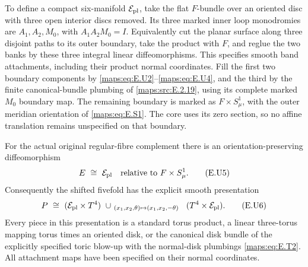 To define a compact six-manifold $\mathcal E_{\rm pl}$, take the
flat $F$-bundle over an oriented disc with three open interior
discs removed.  Its three marked inner loop monodromies are
$A_1,A_2,M_0$, with $A_1A_2M_0=I$.  Equivalently cut the planar
surface along three disjoint paths to its outer boundary, take
the product with $F$, and reglue the two banks by these three
integral linear diffeomorphisms.  This specifies smooth band
attachments, including their product normal coordinates.
Fill the first two boundary components by \eqref{maps:eq:E.U2}--\eqref{maps:eq:E.U4}, and
the third by the finite canonical-bundle plumbing of \ref{maps:src:E.2.19},
using its complete marked $M_0$ boundary map.  The remaining
boundary is marked as $F\times S^1_\mu$, with the outer meridian
orientation of \eqref{maps:eq:E.S1}.  The core uses its zero section, so no
affine translation remains unspecified on that boundary.

For the actual original regular-fibre complement there is an
orientation-preserving diffeomorphism
\[
                  E\ \cong\ \mathcal E_{\rm pl}
                 \quad\hbox{relative to }F\times S^1_\mu .
 \tag{E.U5}\label{maps:eq:E.U5}
\]
Consequently the shifted fivefold has the explicit smooth
presentation
\[
 P\ \cong\
 (\mathcal E_{\rm pl}\times T^4)
 \ \cup_{\ (x_1,x_2,\theta)\mapsto(x_1,x_2,-\theta)\ }\
 (T^4\times\mathcal E_{\rm pl}).
 \tag{E.U6}\label{maps:eq:E.U6}
\]
Every piece in this presentation is a standard torus product,
a linear three-torus mapping torus times an oriented disk, or
the canonical disk bundle of the explicitly specified toric
blow-up with the normal-disk plumbings \eqref{maps:eq:E.T2}.  All attachment
maps have been specified on their normal coordinates.

